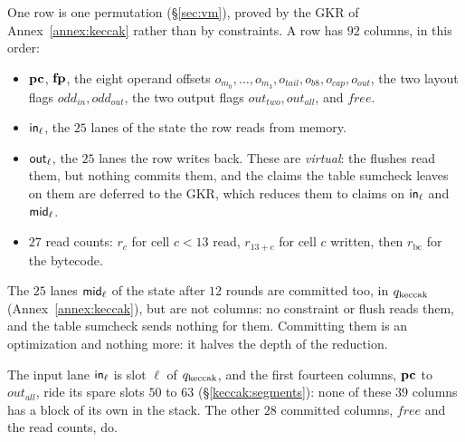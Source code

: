 One row is one permutation (\S\ref{sec:vm}), proved by the GKR of Annex~\ref{annex:keccak} rather than by constraints. A row has $92$ columns, in this order:
\begin{itemize}
\item $\mathbf{pc}$, $\mathbf{fp}$, the eight operand offsets $o_{m_0},\dots,o_{m_3},o_{\mathit{tail}},o_{\mathit{b8}},o_{\mathit{cap}},o_{\mathit{out}}$, the two layout flags $\mathit{odd}_{\mathit{in}},\mathit{odd}_{\mathit{out}}$, the two output flags $\mathit{out}_{\mathit{two}},\mathit{out}_{\mathit{all}}$, and $\mathit{free}$.
\item $\mathsf{in}_{\ell}$, the $25$ lanes of the state the row reads from memory.
\item $\mathsf{out}_{\ell}$, the $25$ lanes the row writes back. These are \emph{virtual}: the flushes read them, but nothing commits them, and the claims the table sumcheck leaves on them are deferred to the GKR, which reduces them to claims on $\mathsf{in}_{\ell}$ and $\mathsf{mid}_{\ell}$.
\item $27$ read counts: $r_c$ for cell $c<13$ read, $r_{13+c}$ for cell $c$ written, then $r_{\mathrm{bc}}$ for the bytecode.
\end{itemize}
The $25$ lanes $\mathsf{mid}_{\ell}$ of the state after $12$ rounds are committed too, in $q_{\mathrm{keccak}}$ (Annex~\ref{annex:keccak}), but are not columns: no constraint or flush reads them, and the table sumcheck sends nothing for them. Committing them is an optimization and nothing more: it halves the depth of the reduction.

The input lane $\mathsf{in}_{\ell}$ is slot $\ell$ of $q_{\mathrm{keccak}}$, and the first fourteen columns, $\mathbf{pc}$ to $\mathit{out}_{\mathit{all}}$, ride its spare slots $50$ to $63$ (\S\ref{keccak:segments}): none of these $39$ columns has a block of its own in the stack. The other $28$ committed columns, $\mathit{free}$ and the read counts, do.

